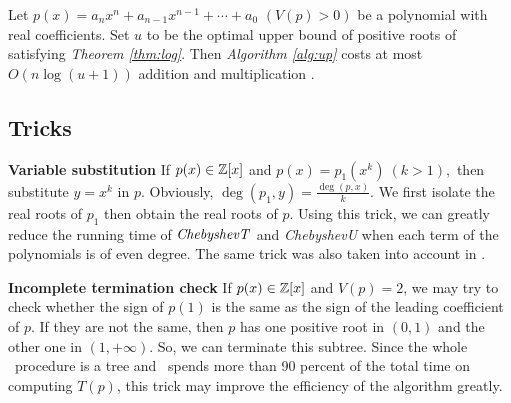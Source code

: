\begin{corollary}
	Let $p(x)=a_nx^n+a_{n-1}x^{n-1}+\cdots+a_0$ $ (V(p)> 0)$ be a polynomial with real coefficients. Set $u$ to be the optimal upper bound of positive roots of  satisfying {\em Theorem
	\ref{thm:log}}. Then  {\em Algorithm \ref{alg:up}} costs at most $O(n\log(u+1))$  addition and multiplication .
\end{corollary}






\subsection{Tricks}
{\bf Variable substitution}
If $p(x)\in {\mathbb Z}[x]$ and $p(x)=p_1(x^k)\ (k>1),$ then substitute $y=x^k$ in $p$. Obviously, $\deg(p_1,y)=\frac{\deg(p,x)}{k}$. We first isolate the real roots of $p_1$ then
obtain the real roots of $p$. Using this trick, we can greatly reduce the running time of ${\it ChebyshevT}$
and {\it ChebyshevU} when each term of the polynomials is of even degree. The same trick was also taken into account in \cite{johnson06}.

{\bf Incomplete termination check}
If $p(x)\in {\mathbb Z}[x]$ and $V(p)= 2$, we may try to check whether the sign of $p(1)$ is the same as the sign of the leading coefficient of $p$. If they are not the same, then $p$  has one positive root in $(0,1)$ and the other one in $(1,+\infty)$. So, we can terminate this subtree. Since the whole \froot\ procedure is a tree and \froot\ spends more than 90 percent of the
total time on computing $T(p)$, this trick may improve the efficiency of the algorithm greatly.
